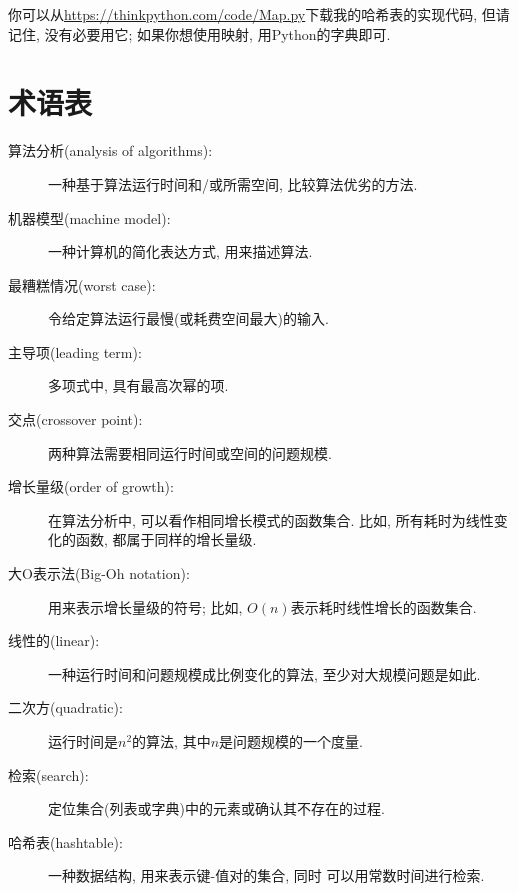 \documentclass[10pt]{book}
\begin{document}
你可以从\url{https://thinkpython.com/code/Map.py}下载我的哈希表的实现代码,
但请记住, 没有必要用它; 如果你想使用映射, 用Python的字典即可.

\section{术语表}

\begin{description}

\item[算法分析(analysis of algorithms):] 一种基于算法运行时间和/或所需空间, 比较算法优劣的方法. 

\item[机器模型(machine model):] 一种计算机的简化表达方式, 用来描述算法.

\item[最糟糕情况(worst case):] 令给定算法运行最慢(或耗费空间最大)的输入.

\item[主导项(leading term):] 多项式中, 具有最高次幂的项.

\item[交点(crossover point):] 两种算法需要相同运行时间或空间的问题规模.

\item[增长量级(order of growth):] 在算法分析中, 可以看作相同增长模式的函数集合.
比如, 所有耗时为线性变化的函数, 都属于同样的增长量级.

\item[大O表示法(Big-Oh notation):] 用来表示增长量级的符号;
比如, $O(n)$表示耗时线性增长的函数集合. 

\item[线性的(linear):] 一种运行时间和问题规模成比例变化的算法,
至少对大规模问题是如此.

\item[二次方(quadratic):] 运行时间是$n^2$的算法, 其中$n$是问题规模的一个度量. 

\item[检索(search):] 定位集合(列表或字典)中的元素或确认其不存在的过程.

\item[哈希表(hashtable):] 一种数据结构, 用来表示键-值对的集合, 同时
可以用常数时间进行检索.

\end{description}


\printindex

\clearemptydoublepage
\end{document}
